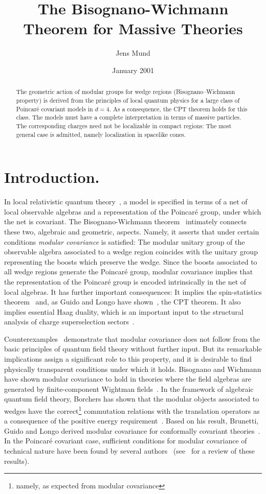 \documentclass[a4paper,reqno,11pt]{amsart}
\title%
{The Bisognano-Wichmann Theorem for Massive Theories}
\author{Jens Mund}
\date{January 2001}
\theoremstyle{plain}
\theoremstyle{definition}
\numberwithin{equation}{section}
\begin{document}
 
\begin{abstract}
The geometric action of modular groups for wedge regions 
(Bisognano--Wich\-mann property) 
is derived from the principles of local quantum physics 
for a large class of Poincar\'e covariant models in $d=4$. 
As a consequence, the CPT theorem holds for this class. 
The models must have a complete interpretation in terms of massive particles.  
The corresponding charges need not be localizable in 
compact regions: The most general case is admitted, namely 
localization in spacelike cones. 
\end{abstract}
\maketitle 
\section*{Introduction.} \label{secIntro} 
In local relativistic quantum theory~\cite{H96}, a model is specified
in terms of a net of local 
observable algebras and a representation of the Poincar\'e group,
under which the net is covariant. The Bisognano-Wichmann 
theorem~\cite{BiWi,BiWi2}  intimately connects 
these two, algebraic and geometric, aspects. 
Namely, it asserts that under certain conditions {\em modular
  covariance} is satisfied: 
The modular unitary group of the observable algebra 
associated to a wedge region coincides with the unitary group representing the 
boosts which preserve the wedge.  
Since the boosts associated to all wedge regions generate the
Poincar\'e group, modular covariance implies that the representation
of the Poincar\'e group is  encoded intrinsically in the net of local 
algebras. 
It has further important consequences: It implies the spin-statistics 
theorem~\cite{Kuck,GL} and, as Guido and Longo
have shown~\cite{GL}, the CPT theorem. It 
also implies essential Haag duality, which is an important input to 
the structural analysis of  charge superselection sectors~\cite{DHRIII,DHRIV}. 

Counterexamples~\cite{Yng94,BGL93,BDFS} demonstrate that modular covariance 
does not follow from the basic principles of quantum field theory 
without further input. But its remarkable implications assign a
significant role to this property, and it is 
desirable to find physically transparent conditions under which it
holds. 
Bi\-sognano and Wichmann have shown modular covariance 
to hold in theories where the field algebras are generated by finite-component 
Wightman fields~\cite{BiWi,BiWi2}. 
In the framework of algebraic quantum field theory,
Borchers  has shown
that the mo\-dular objects associated to wedges have the
correct\footnote{namely, as expected from modular covariance} 
commutation relations with the translation operators as a consequence
of the positive energy requirement~\cite{Borch92}. Based on his 
result, Brunetti, Guido and Longo derived modular covariance 
for conformally covariant theories~\cite{BGL93}. 
In the Poincar\'e covariant case, sufficient conditions for modular
covariance of technical nature have been found by several 
authors~\cite{Borch98,BY00,SHW98,Kuck00,GL00} 
(see~\cite{BY00} for a review of these results). 
\end{document}
